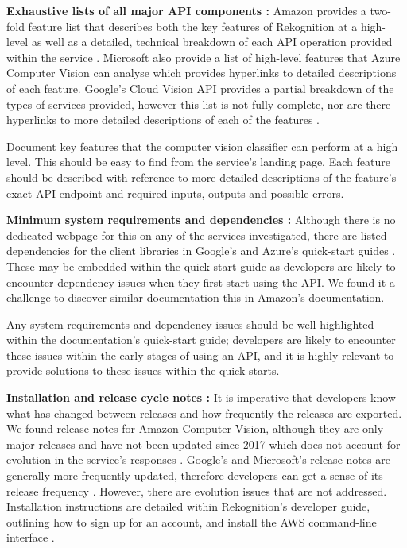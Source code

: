 \noindent
\textbf{Exhaustive lists of all major API components :} Amazon provides a two-fold feature list that describes both the key features of Rekognition at a high-level  as well as a detailed, technical breakdown of each API operation provided within the service . Microsoft also provide a list of high-level features that Azure Computer Vision can analyse  which provides hyperlinks to detailed descriptions of each feature. Google's Cloud Vision API provides a partial breakdown of the types of services provided, however this list is not fully complete, nor are there hyperlinks to more detailed descriptions of each of the features .

\begin{leftbar}
\SuggestedImprovement
Document key features that the computer vision classifier can perform at a high level. This should be easy to find from the service's landing page. Each feature should be described with reference to more detailed descriptions of the feature's exact API endpoint and required inputs, outputs and possible errors.
\end{leftbar}

\noindent
\textbf{Minimum system requirements and dependencies :} Although there is no dedicated webpage for this on any of the services investigated, there are listed dependencies for the client libraries in Google's and Azure's quick-start guides . These may be embedded within the quick-start guide as developers are likely to encounter dependency issues when they first start using the API. We found it a challenge to discover similar documentation this in Amazon's documentation.

\begin{leftbar}
\SuggestedImprovement
Any system requirements and dependency issues should be well-highlighted within the documentation's quick-start guide; developers are likely to encounter these issues within the early stages of using an API, and it is highly relevant to provide solutions to these issues within the quick-starts.
\end{leftbar}

\noindent
\textbf{Installation and release cycle notes :} It is imperative that developers know what has changed between releases and how frequently the releases are exported. We found release notes for Amazon Computer Vision, although they are only major releases and have not been updated since 2017  which does not account for evolution in the service's responses \citep{Cummaudo:2019icsme}. Google's and Microsoft's release notes are generally more frequently updated, therefore developers can get a sense of its release frequency . However, there are evolution issues that are not addressed. Installation instructions are detailed within Rekognition's developer guide, outlining how to sign up for an account, and install the AWS command-line interface .

